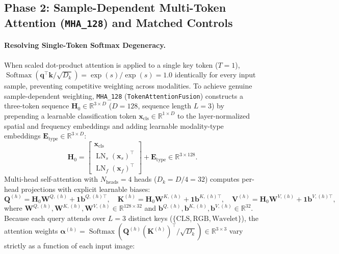 \documentclass[fleqn,10pt]{wlscirep}
\begin{document}
\subsection*{Phase 2: Sample-Dependent Multi-Token Attention (\texttt{MHA\_128}) and Matched Controls}
\paragraph{Resolving Single-Token Softmax Degeneracy.}
When scaled dot-product attention is applied to a single key token ($T=1$), $\operatorname{Softmax}\!\left(\mathbf{q}^\top\mathbf{k}/\sqrt{D_k}\right) = \exp(s)/\exp(s) = 1.0$ identically for every input sample, preventing competitive weighting across modalities. To achieve genuine sample-dependent weighting, \texttt{MHA\_128} (\texttt{TokenAttentionFusion}) constructs a three-token sequence $\mathbf{H}_0 \in \mathbb{R}^{3 \times D}$ ($D=128$, sequence length $L=3$) by prepending a learnable classification token $\mathbf{x}_{\text{cls}} \in \mathbb{R}^{1 \times D}$ to the layer-normalized spatial and frequency embeddings and adding learnable modality-type embeddings $\mathbf{E}_{\text{type}} \in \mathbb{R}^{3 \times D}$:
\begin{equation}
\mathbf{H}_0 = \begin{bmatrix} \mathbf{x}_{\text{cls}} \\ \operatorname{LN}_s(\mathbf{x}_s)^\top \\ \operatorname{LN}_f(\mathbf{x}_f)^\top \end{bmatrix} + \mathbf{E}_{\text{type}} \in \mathbb{R}^{3 \times 128}.
\label{eq:token_seq}
\end{equation}
Multi-head self-attention with $N_{\text{heads}}=4$ heads ($D_k = D/4 = 32$) computes per-head projections with explicit learnable biases:
\begin{equation}
\mathbf{Q}^{(h)} = \mathbf{H}_0 \mathbf{W}^{Q,(h)} + \mathbf{1}\mathbf{b}^{Q,(h)\top}, \quad
\mathbf{K}^{(h)} = \mathbf{H}_0 \mathbf{W}^{K,(h)} + \mathbf{1}\mathbf{b}^{K,(h)\top}, \quad
\mathbf{V}^{(h)} = \mathbf{H}_0 \mathbf{W}^{V,(h)} + \mathbf{1}\mathbf{b}^{V,(h)\top},
\label{eq:qkv}
\end{equation}
where $\mathbf{W}^{Q,(h)},\mathbf{W}^{K,(h)},\mathbf{W}^{V,(h)} \in \mathbb{R}^{128 \times 32}$ and $\mathbf{b}^{Q,(h)},\mathbf{b}^{K,(h)},\mathbf{b}^{V,(h)} \in \mathbb{R}^{32}$. Because each query attends over $L=3$ distinct keys ($\{\text{CLS}, \text{RGB}, \text{Wavelet}\}$), the attention weights $\boldsymbol{\alpha}^{(h)} = \operatorname{Softmax}\!\left(\mathbf{Q}^{(h)}(\mathbf{K}^{(h)})^\top/\sqrt{D_k}\right) \in \mathbb{R}^{3 \times 3}$ vary strictly as a function of each input image:
\end{document}
